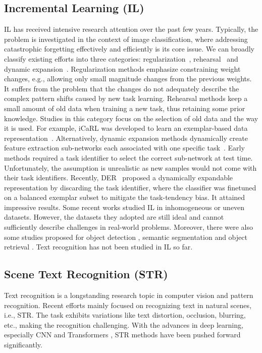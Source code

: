 \documentclass[10pt,twocolumn,letterpaper]{article}
\begin{document}
\subsection{Incremental Learning (IL)}
IL has received intensive research attention over the past few years. Typically, the problem is investigated in the context of image classification, where addressing catastrophic forgetting effectively and efficiently is its core issue. 
We can broadly classify existing efforts into three categories: regularization~\cite{kirkpatrick2017ewc, Zenke2017CLTSI, Dhar2019LWM}, rehearsal~\cite{Parisi2019CLreview, Castro2018e2e, Aljundi2018MAS} and dynamic expansion~\cite{Aljundi2017expert_gate, Yan2021DER, Douillard2022Dytox, huang2023resolving}. Regularization methods emphasize constraining weight changes, e.g., allowing only small magnitude changes from the previous weights. It suffers from the problem that the changes do not adequately describe the complex pattern shifts caused by new task learning. Rehearsal methods keep a small amount of old data when training a new task, thus retaining some prior knowledge. Studies in this category focus on the selection of old data and the way it is used. For example, iCaRL was developed to learn an exemplar-based data representation~\cite{Rebuffi2017icarl}. Alternatively, dynamic expansion methods dynamically create feature extraction sub-networks each associated with one specific task~\cite{Golkar2019CLNR, Collier2020RNCCL, Wen2020Batchensemble, huang2023resolving}. Early methods required a task identifier to select the correct sub-network at test time. Unfortunately, the assumption is unrealistic as new samples would not come with their task identifiers. Recently, DER~\cite{Yan2021DER} proposed a dynamically expandable representation by discarding the task identifier, where the classifier was finetuned on a balanced exemplar subset to mitigate the task-tendency bias. It attained impressive results. Some recent works \cite{belouadah2019IL2M,delange2022clsurvey} studied IL in inhomogeneous or uneven datasets. However, the datasets they adopted are still ideal and cannot sufficiently describe challenges in real-world problems. Moreover, there were also some studies proposed for object detection \cite{feng2022overcoming, chen2019new, yang2022multi, yang2023one}, semantic segmentation \cite{yang2022uncertainty,douillard2021plop,zhang2022rcil} and object retrieval \cite{liu2023balanced}. Text recognition has not been studied in IL so far.

\subsection{Scene Text Recognition (STR)}
Text recognition is a longstanding research topic in computer vision and pattern recognition. Recent efforts mainly focused on recognizing text in natural scenes, i.e., STR. The task exhibits variations like text distortion, occlusion, blurring, etc., making the recognition challenging. With the advances in deep learning, especially CNN \cite{bai2014chinese,ShiBY17crnn,hu2020gtc,shi2018aster} and Transformers \cite{sheng2019nrtr,ABInet21CVPR,zheng2021cdistnet,wang2021visionlan,du2022@svtr,wang2022petr}, STR methods have been pushed forward significantly. 
\end{document}
